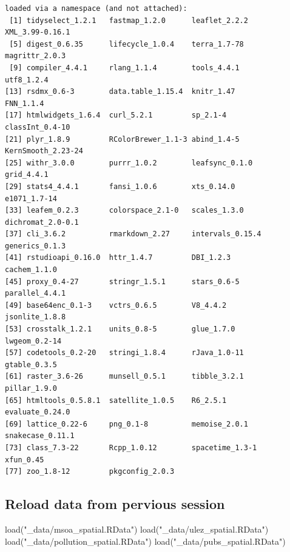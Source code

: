 \documentclass[
  letterpaper,
]{scrbook}
\newenvironment{Shaded}{\begin{snugshade}}{\end{snugshade}}
\newcommand{\FunctionTok}[1]{\textcolor[rgb]{0.28,0.35,0.67}{#1}}
\newcommand{\NormalTok}[1]{\textcolor[rgb]{0.00,0.23,0.31}{#1}}
\newcommand{\StringTok}[1]{\textcolor[rgb]{0.13,0.47,0.30}{#1}}
\begin{document}
\begin{verbatim}
loaded via a namespace (and not attached):
 [1] tidyselect_1.2.1   fastmap_1.2.0      leaflet_2.2.2      XML_3.99-0.16.1   
 [5] digest_0.6.35      lifecycle_1.0.4    terra_1.7-78       magrittr_2.0.3    
 [9] compiler_4.4.1     rlang_1.1.4        tools_4.4.1        utf8_1.2.4        
[13] rsdmx_0.6-3        data.table_1.15.4  knitr_1.47         FNN_1.1.4         
[17] htmlwidgets_1.6.4  curl_5.2.1         sp_2.1-4           classInt_0.4-10   
[21] plyr_1.8.9         RColorBrewer_1.1-3 abind_1.4-5        KernSmooth_2.23-24
[25] withr_3.0.0        purrr_1.0.2        leafsync_0.1.0     grid_4.4.1        
[29] stats4_4.4.1       fansi_1.0.6        xts_0.14.0         e1071_1.7-14      
[33] leafem_0.2.3       colorspace_2.1-0   scales_1.3.0       dichromat_2.0-0.1 
[37] cli_3.6.2          rmarkdown_2.27     intervals_0.15.4   generics_0.1.3    
[41] rstudioapi_0.16.0  httr_1.4.7         DBI_1.2.3          cachem_1.1.0      
[45] proxy_0.4-27       stringr_1.5.1      stars_0.6-5        parallel_4.4.1    
[49] base64enc_0.1-3    vctrs_0.6.5        V8_4.4.2           jsonlite_1.8.8    
[53] crosstalk_1.2.1    units_0.8-5        glue_1.7.0         lwgeom_0.2-14     
[57] codetools_0.2-20   stringi_1.8.4      rJava_1.0-11       gtable_0.3.5      
[61] raster_3.6-26      munsell_0.5.1      tibble_3.2.1       pillar_1.9.0      
[65] htmltools_0.5.8.1  satellite_1.0.5    R6_2.5.1           evaluate_0.24.0   
[69] lattice_0.22-6     png_0.1-8          memoise_2.0.1      snakecase_0.11.1  
[73] class_7.3-22       Rcpp_1.0.12        spacetime_1.3-1    xfun_0.45         
[77] zoo_1.8-12         pkgconfig_2.0.3   
\end{verbatim}

\hypertarget{reload-data-from-pervious-session}{%
\subsection*{Reload data from pervious
session}\label{reload-data-from-pervious-session}}

\begin{Shaded}
\begin{Highlighting}[]
\FunctionTok{load}\NormalTok{(}\StringTok{"\_data/msoa\_spatial.RData"}\NormalTok{)}
\FunctionTok{load}\NormalTok{(}\StringTok{"\_data/ulez\_spatial.RData"}\NormalTok{)}
\FunctionTok{load}\NormalTok{(}\StringTok{"\_data/pollution\_spatial.RData"}\NormalTok{)}
\FunctionTok{load}\NormalTok{(}\StringTok{"\_data/pubs\_spatial.RData"}\NormalTok{)}
\end{Highlighting}
\end{Shaded}
\end{document}
